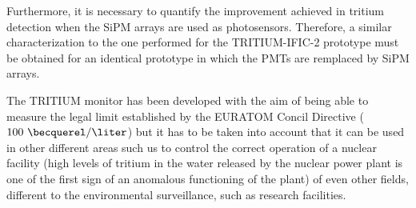Furthermore, it is necessary to quantify the improvement achieved in tritium detection when the SiPM arrays are used as photosensors. Therefore, a similar characterization to the one performed for the TRITIUM-IFIC-2 prototype must be obtained for an identical prototype in which the PMTs are remplaced by SiPM arrays.

The TRITIUM monitor has been developed with the aim of being able to measure the legal limit established by the EURATOM Concil Directive ($100~\becquerel/\liter$) but it has to be taken into account that it can be used in other different areas such us to control the correct operation of a nuclear facility (high levels of tritium in the water released by the nuclear power plant is one of the first sign of an anomalous functioning of the plant) of even other fields, different to the environmental surveillance, such as research facilities.